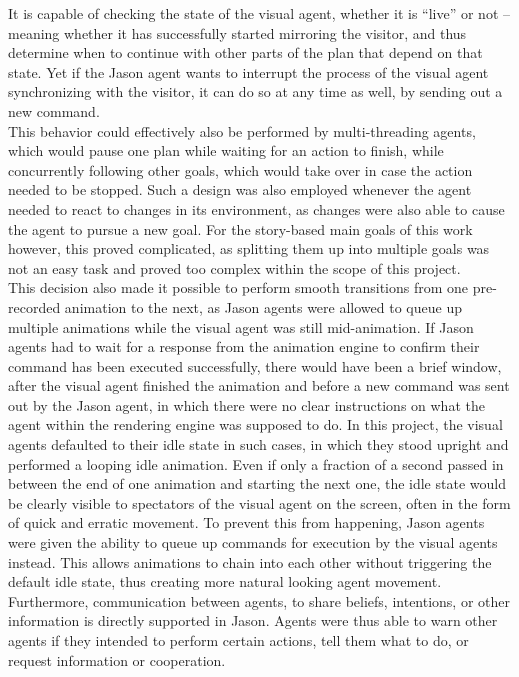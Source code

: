 \documentclass[draft,final]{vutinfth} %
\begin{document}
It is capable of checking the state of the visual agent, whether it is “live” or not – meaning whether it has successfully started mirroring the visitor, and thus determine when to continue with other parts of the plan that depend on that state. 
Yet if the Jason agent wants to interrupt the process of the visual agent synchronizing with the visitor, it can do so at any time as well, by sending out a new command. \\
This behavior could effectively also be performed by multi-threading agents, which would pause one plan while waiting for an action to finish, while concurrently following other goals, which would take over in case the action needed to be stopped. 
Such a design was also employed whenever the agent needed to react to changes in its environment, as changes were also able to cause the agent to pursue a new goal. 
For the story-based main goals of this work however, this proved complicated, as splitting them up into multiple goals was not an easy task and proved too complex within the scope of this project.\\
This decision also made it possible to perform smooth transitions from one pre-recorded animation to the next, as Jason agents were allowed to queue up multiple animations while the visual agent was still mid-animation.
If Jason agents had to wait for a response from the animation engine to confirm their command has been executed successfully, there would have been a brief window, after the visual agent finished the animation and before a new command was sent out by the Jason agent, in which there were no clear instructions on what the agent within the rendering engine was supposed to do. 
In this project, the visual agents defaulted to their idle state in such cases, in which they stood upright and performed a looping idle animation. 
Even if only a fraction of a second passed in between the end of one animation and starting the next one, the idle state would be clearly visible to spectators of the visual agent on the screen, often in the form of quick and erratic movement. 
To prevent this from happening, Jason agents were given the ability to queue up commands for execution by the visual agents instead. 
This allows animations to chain into each other without triggering the default idle state, thus creating more natural looking agent movement. \\
Furthermore, communication between agents, to share beliefs, intentions, or other information is directly supported in Jason. 
Agents were thus able to warn other agents if they intended to perform certain actions, tell them what to do, or request information or cooperation. 
\end{document}

